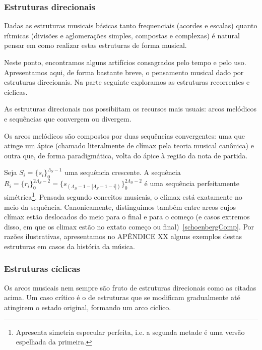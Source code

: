 \subsubsection{Estruturas direcionais}

Dadas as estruturas musicais básicas tanto frequenciais (acordes e escalas) quanto 
rítmicas (divisões e aglomerações simples, compostas e complexas) é 
natural pensar em como realizar estas estruturas de forma musical.

Neste ponto, encontramos alguns artifícios consagrados pelo tempo e pelo uso. 
Apresentamos aqui, de forma bastante breve, o pensamento musical dado por estruturas direcionais.
Na parte seguinte exploramos as estruturas recorrentes e cíclicas.

As estruturas direcionais nos possibiitam os recursos mais usuais: arcos melódicos e sequências que convergem ou divergem.

Os arcos melódicos são compostos por duas sequências convergentes: 
uma que atinge um ápice (chamado literalmente de clímax pela teoria musical canônica) e 
outra que, de forma paradigmática, volta do ápice à região da nota de partida.

Seja $S_i=\{s_i\}_0^{\Lambda_S-1}$ uma sequência crescente. A sequência 
$R_i=\{r_i\}_0^{2\Lambda_S -2}=\{s_{(\Lambda_S-1-|\Lambda_S-1-i|)}\}_0^{2\Lambda_S-2}$ 
é uma sequência perfeitamente simétrica\footnote{Apresenta simetria especular perfeita, i.e. a segunda metade é uma versão espelhada da primeira.}. Pensada segundo conceitos musicais, o clímax está exatamente no meio da sequência. 
Canonicamente, distinguimos também entre arcos cujos clímax estão deslocados do meio para o final 
e para o começo (e casos extremos disso, em que os climax estão no extato começo ou final)~\ref{schoenbergComp}.
Por razões ilustrativas, apresentamos no APÊNDICE XX alguns exemplos 
destas estruturas em casos da história da música.

\subsubsection{Estruturas cíclicas}
Os arcos musicais nem sempre são fruto de estruturas direcionais como as citadas
acima. Um caso crítico é o de estruturas que se modificam gradualmente
até atingirem o estado original, formando um arco cíclico.

